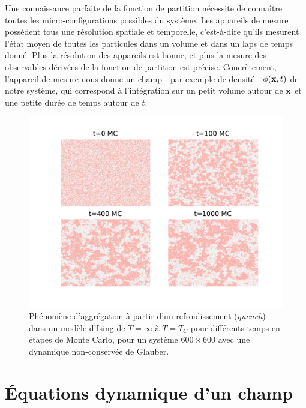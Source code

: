 Une connaissance parfaite de la fonction de partition nécessite de connaître toutes les micro-configurations possibles du système. Les appareils de mesure possèdent tous une résolution spatiale et temporelle, c'est-à-dire qu'ils mesurent l'état moyen de toutes les particules dans un volume et dans un laps de temps donné. Plus la résolution des appareils est bonne, et plus la mesure des observables dérivées de la fonction de partition est précise. 
Concrètement, l'appareil de mesure nous donne un champ - par exemple de densité - $\phi({\bf x},t)$ de notre système, qui correspond à l'intégration sur un petit volume autour de ${\bf x}$ et une petite durée de temps autour de $t$. 

\begin{figure}[h]
    \centering
    \includegraphics[width=0.9\linewidth]{intro/clusterization.pdf}
    \caption{Phénomène d'aggrégation à partir d'un refroidissement (\textit{quench}) dans un modèle d'Ising de $T=\infty$ à $T=T_C$ pour différents temps en étapes de Monte Carlo, pour un système $600 \times 600$ avec une dynamique non-conservée de Glauber.}
    \label{clusterization}
\end{figure}

    \section{Équations dynamique d'un champ}

